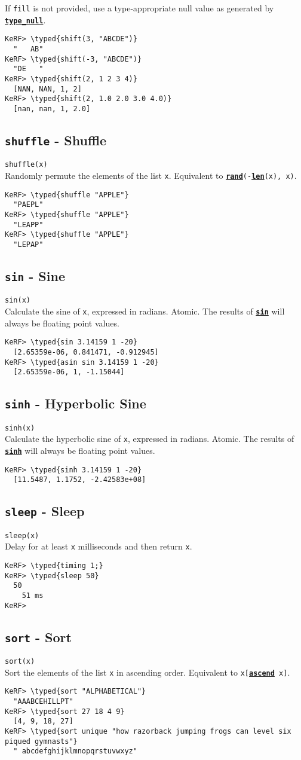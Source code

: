 \documentclass{article}
\newcommand{\typed}[1]{\textcolor{TealBlue}{#1}}
\newcommand{\primdefu}[3]{\subsection{\texttt{#1} - #2}\label{prim:#3}}
\newcommand{\primu}[2]{\hyperref[prim:#2]{\textbf{\texttt{#1}}}}
\newcommand{\primdef}[2]{\primdefu{#1}{#2}{#1}}
\newcommand{\prim}[1]{\primu{#1}{#1}}
\begin{document}
If \texttt{fill} is not provided, use a type-appropriate null value as generated by \primu{type\_null}{typeNull}.
\begin{Verbatim}
KeRF> \typed{shift(3, "ABCDE")}
  "   AB"
KeRF> \typed{shift(-3, "ABCDE")}
  "DE   "
KeRF> \typed{shift(2, 1 2 3 4)}
  [NAN, NAN, 1, 2]
KeRF> \typed{shift(2, 1.0 2.0 3.0 4.0)}
  [nan, nan, 1, 2.0]
\end{Verbatim}

\primdef{shuffle}{Shuffle}
\texttt{shuffle(x)}\\

Randomly permute the elements of the list \texttt{x}. Equivalent to \texttt{\prim{rand}(-\prim{len}(x), x)}.
\begin{Verbatim}
KeRF> \typed{shuffle "APPLE"}
  "PAEPL"
KeRF> \typed{shuffle "APPLE"}
  "LEAPP"
KeRF> \typed{shuffle "APPLE"}
  "LEPAP"
\end{Verbatim}

\primdef{sin}{Sine}
\texttt{sin(x)}\\

Calculate the sine of \texttt{x}, expressed in radians. Atomic. The results of \prim{sin} will always be floating point values.
\begin{Verbatim}
KeRF> \typed{sin 3.14159 1 -20}
  [2.65359e-06, 0.841471, -0.912945]
KeRF> \typed{asin sin 3.14159 1 -20}
  [2.65359e-06, 1, -1.15044]
\end{Verbatim}

\pagebreak
\primdef{sinh}{Hyperbolic Sine}
\texttt{sinh(x)}\\

Calculate the hyperbolic sine of \texttt{x}, expressed in radians. Atomic. The results of \prim{sinh} will always be floating point values.
\begin{Verbatim}
KeRF> \typed{sinh 3.14159 1 -20}
  [11.5487, 1.1752, -2.42583e+08]
\end{Verbatim}

\primdef{sleep}{Sleep}
\texttt{sleep(x)}\\

Delay for at least \texttt{x} milliseconds and then return \texttt{x}.
\begin{Verbatim}
KeRF> \typed{timing 1;}
KeRF> \typed{sleep 50}
  50
    51 ms
KeRF>
\end{Verbatim}

\primdef{sort}{Sort}
\texttt{sort(x)}\\

Sort the elements of the list \texttt{x} in ascending order. Equivalent to \texttt{x[\prim{ascend} x]}.
\begin{Verbatim}
KeRF> \typed{sort "ALPHABETICAL"}
  "AAABCEHILLPT"
KeRF> \typed{sort 27 18 4 9}
  [4, 9, 18, 27]
KeRF> \typed{sort unique "how razorback jumping frogs can level six piqued gymnasts"}
  " abcdefghijklmnopqrstuvwxyz"
\end{Verbatim}
\end{document}

